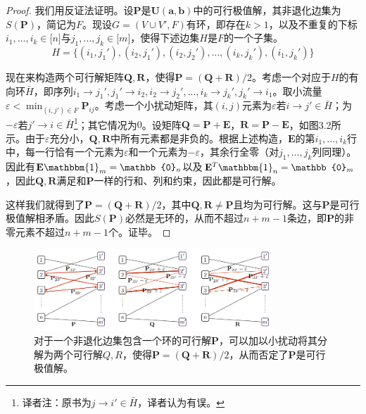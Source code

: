 \documentclass[cn,10pt,math=newtx,citestyle=gb7714-2015,bibstyle=gb7714-2015]{elegantbook}
\begin{document}
\begin{proof}
我们用反证法证明。设$\mathbf{P}$是$\mathbf{U(a,b)}$中的可行极值解，其非退化边集为$S(\mathbf{P})$，简记为$F$。现设$G=(V\cup V',F)$有环，即存在$k>1$，以及不重复的下标$i_1,...,i_{k}\in\mathbb{[}n\mathbb{]}$与$j_1,...,j_{k}\in\mathbb{[}m\mathbb{]}$，使得下述边集$H$是$F$的一个子集。
\begin{equation*}
    H=\{ (i_1,j_1'),(i_2,j_1'),(i_2,j_2'),...,(i_k,j_k'),(i_1,j_k')\}
\end{equation*}

现在来构造两个可行解矩阵$\mathbf{Q,R}$，使得$\mathbf{P}=(\mathbf{Q+R})/2$。考虑一个对应于$H$的有向环$\bar H$，即序列$i_1\to j_1',j_1'\to i_2,i_2\to j_2',...,i_k\to j_k',j_k'\to i_1$。取小流量$\varepsilon<\min_{(i,j')\in F}\mathbf{P}_{ij}$。考虑一个小扰动矩阵，其$(i,j)$元素为$\varepsilon$若$i\to j'\in\bar H$；为$-\varepsilon$若$j'\to i\in\bar H$\footnote{译者注：原书为$j\to i'\in\bar H$，译者认为有误。}；其它情况为$0$。设矩阵$\mathbf{Q}=\mathbf{P+E}$，$\mathbf{R}=\mathbf{P-E}$，如图3.2所示。由于$\varepsilon$充分小，$\mathbf{Q,R}$中所有元素都是非负的。根据上述构造，$\mathbf{E}$的第$i_1,...,i_k$行中，每一行恰有一个元素为$\varepsilon$和一个元素为$-\varepsilon$，其余行全零（对$j_1,...,j_k$列同理）。因此有$\mathbf{E}\mathbbm{1}_m=\mathbb{0}_n$以及$\mathbf{E}^T\mathbbm{1}_n=\mathbb{0}_m$，因此$\mathbf{Q,R}$满足和$\mathbf{P}$一样的行和、列和约束，因此都是可行解。

这样我们就得到了$\mathbf{P}=(\mathbf{Q+R})/2$，其中$\mathbf{Q,R}\neq \mathbf{P}$且均为可行解。这与$\mathbf{P}$是可行极值解相矛盾。因此$S(\mathbf{P})$必然是无环的，从而不超过$n+m-1$条边，即$\mathbf{P}$的非零元素不超过$n+m-1$个。证毕。
\end{proof}

\begin{figure}[H]
    \centering
    \includegraphics[width=0.8\textwidth]{figure/fig3.2.png}
    \caption{对于一个非退化边集包含一个环的可行解$\mathbf{P}$，可以加以小扰动将其分解为两个可行解$Q,R$，使得$\mathbf{P}=(\mathbf{Q+R})/2$，从而否定了$\mathbf{P}$是可行极值解。}
    \label{图3.2}
\end{figure}
\end{document}
